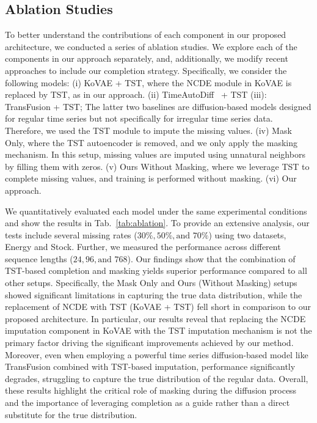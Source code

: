 \documentclass{article}
\theoremstyle{plain}
\theoremstyle{definition}
\theoremstyle{remark}
\begin{document}
\vspace{-2mm}
\subsection{Ablation Studies}
\label{subsec:ablation}
\vspace{-2mm}

To better understand the contributions of each component in our proposed architecture, we conducted a series of ablation studies. We explore each of the components in our approach separately, and, additionally, we modify recent approaches to include our completion strategy. Specifically, we consider the following models: (i) KoVAE + TST, where the NCDE module in KoVAE is replaced by TST, as in our approach. (ii) TimeAutoDiff~\cite{suh2024timeautodiff} + TST (iii): TransFusion \cite{sikder2023transfusion}
 + TST; The latter two baselines are diffusion-based models designed for regular time series but not specifically for irregular time series data. Therefore, we used the TST module to impute the missing values. (iv) Mask Only, where the TST autoencoder is removed, and we only apply the masking mechanism. In this setup, missing values are imputed using unnatural neighbors by filling them with zeros. (v) Ours Without Masking, where we leverage TST to complete missing values, and training is performed without masking. (vi) Our approach.



We quantitatively evaluated each model under the same experimental conditions and show the results in Tab.~\ref{tab:ablation}. To provide an extensive analysis, our tests include several missing rates ($30\%, 50\%, \text{and } 70\%$) using two datasets, Energy and Stock. Further, we measured the performance across different sequence lengths ($24, 96, \text{and } 768$). Our findings show that the combination of TST-based completion and masking yields superior performance compared to all other setups. Specifically, the Mask Only and Ours (Without Masking) setups showed significant limitations in capturing the true data distribution, while the replacement of NCDE with TST (KoVAE + TST) fell short in comparison to our proposed architecture. In particular, our results reveal that replacing the NCDE imputation component in KoVAE with the TST imputation mechanism is not the primary factor driving the significant improvements achieved by our method. Moreover, even when employing a powerful time series diffusion-based model like TransFusion combined with TST-based
imputation, performance significantly degrades, struggling to capture the true distribution of the regular data. Overall, these results highlight the critical role of masking during the diffusion process and the importance of leveraging completion as a guide rather than a direct substitute for the true distribution. 
\end{document}
